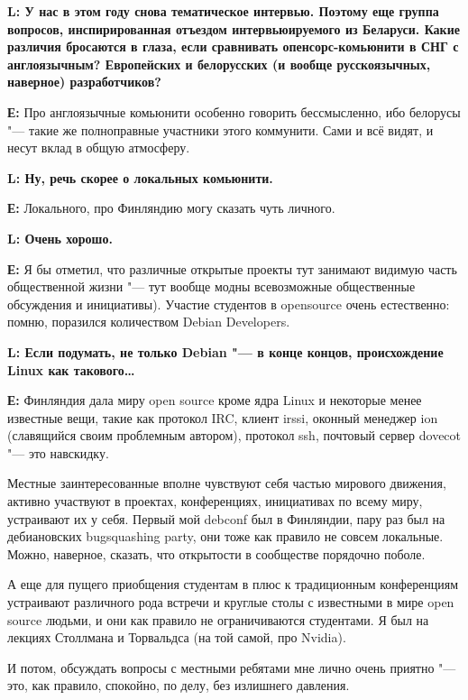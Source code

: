 \documentclass[10pt, a5paper]{article}
\begin{document}
{\noindent \bf L: У нас в этом году снова тематическое интервью. Поэтому еще группа вопросов, инспирированная отъездом интервьюируемого из Беларуси. Какие различия бросаются в глаза, если сравнивать опенсорс-комьюнити в
СНГ с англоязычным? Европейских и белорусских (и вообще русскоязычных, наверное) разработчиков?}

{\noindent \bf Е:} Про англоязычные комьюнити особенно говорить бессмысленно, ибо белорусы "--- такие же полноправные участники этого коммунити. Сами и всё видят, и несут вклад в общую атмосферу.

{\noindent \bf L: Ну, речь скорее о локальных комьюнити. }

{\noindent \bf Е:} Локального, про Финляндию могу сказать чуть личного.

{\noindent \bf L: Очень хорошо. }

{\noindent \bf Е:} Я бы отметил, что различные открытые проекты тут занимают видимую часть 
общественной жизни "--- тут вообще модны всевозможные общественные обсуждения и
инициативы). Участие студентов в opensource очень естественно: помню, поразился количеством Debian Developers.  

{\noindent \bf L: Если подумать, не только Debian "--- в конце концов, происхождение Linux как такового\ldots}

{\noindent \bf Е:} Финляндия дала миру open source кроме ядра Linux и некоторые менее известные вещи, такие как протокол IRC, клиент  irssi, оконный менеджер ion (славящийся своим проблемным автором), протокол ssh, почтовый сервер dovecot "--- это навскидку.

Местные заинтересованные вполне чувствуют себя частью мирового движения, активно участвуют в проектах, конференциях, инициативах по всему миру, устраивают их у себя. Первый мой debconf был в Финляндии, пару раз был на
дебиановских bug\linebreak squashing party, они тоже как правило не совсем локальные. Можно, наверное, сказать, что открытости в сообществе порядочно поболе. 


А еще для пущего приобщения студентам в плюс к традиционным конференциям устраивают различного рода встречи и круглые столы с известными в мире open source людьми, и они как правило не ограничиваются студентами. Я был на лекциях Столлмана и Торвальдса (на той самой, про Nvidia).

И потом, обсуждать вопросы с местными ребятами мне лично очень приятно "--- это, как правило, спокойно, по делу, без излишнего давления.
\end{document}
